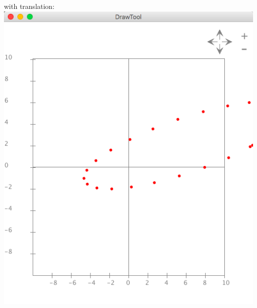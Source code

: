 \documentclass{article}
\begin{document}
\begin{enumerate}
with translation:\\
\includegraphics[scale=0.3]{exercise23_with_translation}


\end{enumerate}
\end{document}

